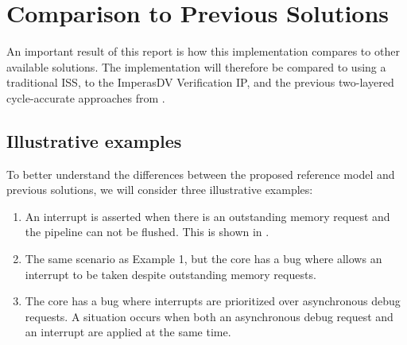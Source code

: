 %
%
%
%


\section{Comparison to Previous Solutions}
\label{sec:res_comparison}

An important result of this report is how this implementation compares to other available solutions. The implementation will therefore be compared to using a traditional ISS, to the ImperasDV Verification IP, and the previous two-layered cycle-accurate approaches from . 

\subsection{Illustrative examples}

To better understand the differences between the proposed reference model and previous solutions, we will consider three illustrative examples:

\begin{enumerate}[label=\textbf{Example \arabic*}]
    \item An interrupt is asserted when there is an outstanding memory request and the pipeline can not be flushed. This is shown in .
    \item The same scenario as Example 1, but the core has a bug where  allows an interrupt to be taken despite outstanding memory requests.
    \item The core has a bug where interrupts are prioritized over asynchronous debug requests. A situation occurs when both an asynchronous debug request and an interrupt are applied at the same time. 
\end{enumerate}

